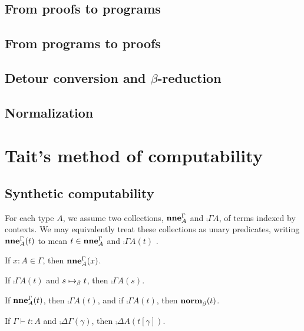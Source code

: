 \documentclass[a4paper]{article}
\begin{document}
\subsection{From proofs to programs}
\label{sec:0002}

\subsection{From programs to proofs}
\label{sec:0003}

\subsection{Detour conversion and $\beta$-reduction}
\label{sec:0005}

\subsection{Normalization}
\label{sec:0004}

\section{Tait's method of computability}
\label{sec:0006}

\subsection{Synthetic computability}
\label{sec:0108}

For each type $A$, we assume two collections, $\operatorname{\mathbf{nne}}^{\Gamma}_{A}$ and $\comp{\Gamma}{A}$, of terms indexed by contexts.
We may equivalently treat these collections as unary predicates, writing $\operatorname{\mathbf{nne}}^{\Gamma}_{A}(t)$ to mean $t \in \operatorname{\mathbf{nne}}^{\Gamma}_{A}$ and $\comp{\Gamma}{A}(t)$ \mutatismutandis.

\begin{axiom}\label{ax:0002}
  If $x : A \in \Gamma$, then $\operatorname{\mathbf{nne}}^{\Gamma}_{A}(x)$.
\end{axiom}

\begin{axiom}\label{ax:0003}
  If $\comp{\Gamma}{A}(t)$ and $s \bRed t$, then $\comp{\Gamma}{A}(s)$.
\end{axiom}

\begin{axiom}\label{ax:0000}
  If $\operatorname{\mathbf{nne}}^{\Gamma}_{A}(t)$, then $\comp{\Gamma}{A}(t)$, and if $\comp{\Gamma}{A}(t)$, then $\operatorname{\mathbf{norm}}^{}_{\beta}(t)$.
\end{axiom}

\begin{axiom}\label{ax:0001}
  If $\Gamma \vdash t : A$ and $\comp{\Delta}{\Gamma}(\gamma)$, then $\comp{\Delta}{A}(t[\gamma])$.
\end{axiom}
\end{document}
